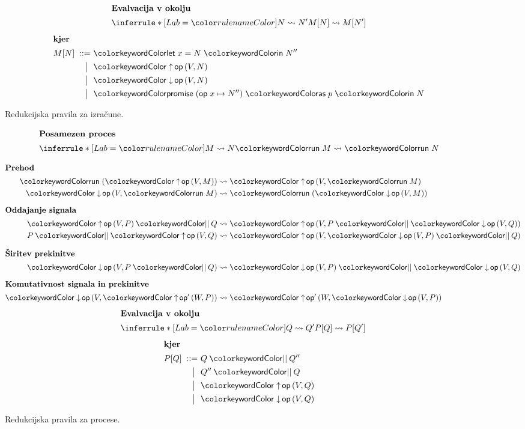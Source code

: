 \begin{figure}[H]
	\begin{align*}
	\intertext{\textbf{Evalvacija v okolju}}
	\coopinfer{}{
		N \reduces N'
	}{
		M[N] \reduces M[N']
	}
	\end{align*}
	\vspace{-6ex}
	\begin{align*}
	\intertext{\textbf{kjer}}
	\text{$M[N]$}
	\bnfis & \tmlet{x}{N}{N''}
	\\
	\bnfor & \tmopout{op}{V}{N}
	\\
	\bnfor & \tmopin{op}{V}{N} 
	\\
	\bnfor & \tmwith{op}{x}{N''}{p}{N}
	\end{align*}
	
	\caption{Redukcijska pravila za izračune.}
	\label{fig:small-step-semantics-of-computations}
\end{figure}

\begin{figure}[H]
    \centering
	\small
	\begin{minipage}[t]{0.4\textwidth}
		\centering
		\begin{align*}
		\intertext{\textbf{Posamezen proces}}
		\coopinfer{}{
			M \reduces N
		}{
			\tmrun M \reduces \tmrun N
		}
		\end{align*}
	\end{minipage}
	\qquad
	\begin{align*}
	\intertext{\textbf{Prehod}}
	\tmrun {(\tmopout{op}{V}{M})}  &\reduces \tmopout{op}{V}{\tmrun M}
	\\
	\tmopin{op}{V}{\tmrun M} &\reduces \tmrun {(\tmopin{op}{V}{M})}
	\\[1ex]
	\intertext{\textbf{Oddajanje signala}}
	\tmpar{\tmopout{op}{V}{P}}{Q} &\reduces \tmopout{op}{V}{\tmpar{P}{\tmopin{op}{V}{Q}}}
	\\
	\tmpar{P}{\tmopout{op}{V}{Q}} &\reduces \tmopout{op}{V}{\tmpar{\tmopin{op}{V}{P}}{Q}}
	\\[1ex]
	\intertext{\textbf{Širitev prekinitve}}
	\tmopin{op}{V}{\tmpar P Q} &\reduces \tmpar {\tmopin{op}{V}{P}} {\tmopin{op}{V}{Q}}
	\\[1ex]
	\intertext{\textbf{Komutativnost signala in prekinitve}}
	\tmopin{op}{V}{\tmopout{op'}{W}{P}} &\reduces \tmopout{op'}{W}{\tmopin{op}{V}{P}}
	\end{align*}
	\vspace{-4ex}
	\begin{align*}
	\shortintertext{\quad\textbf{Evalvacija v okolju}}
	\quad
	\coopinfer{}{
		Q \reduces Q'
	}{
		P[Q] \reduces P[Q']
	}
	\end{align*}
	\vspace{-6ex}
	\begin{align*}
	\intertext{\textbf{kjer}}
	\text{$P[Q]$}
	\bnfis & \tmpar{Q}{Q''} 
	\\
	\bnfor & \tmpar{Q''}{Q}
	\\
	\bnfor & \tmopout{op}{V}{Q}
	\\
	\bnfor & \tmopin{op}{V}{Q}
	\end{align*}
	
	\caption{Redukcijska pravila za procese.}
	\label{fig:small-step-semantics-of-processes}
\end{figure}

